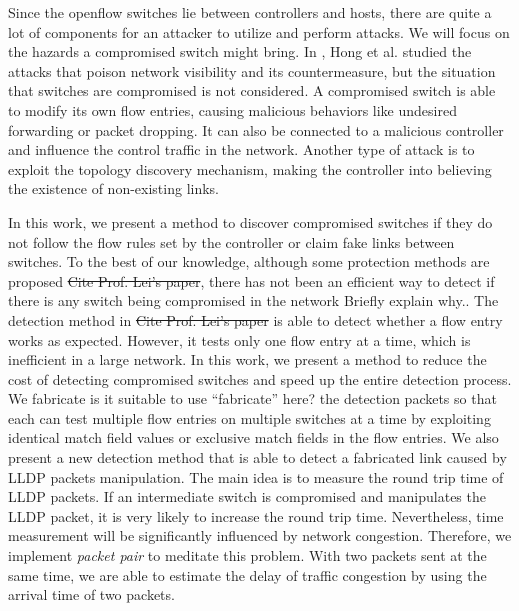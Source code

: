 Since the openflow switches lie between controllers and hosts, there are quite a lot of components for an attacker to utilize and perform attacks. We will focus on the hazards a compromised switch might bring.
In \cite{HXWG15}, Hong et al. studied the attacks that poison network visibility and its countermeasure, but the situation that switches are compromised is not considered. A compromised switch is able to modify its own flow entries, causing malicious behaviors like undesired forwarding or packet dropping. It can also be connected to a malicious controller and influence the control traffic in the network. Another type of attack is to exploit the topology discovery mechanism, making the controller into believing the existence of non-existing links.

In this work, we present a method to discover compromised switches if they do not follow the flow rules set by the controller or claim fake links between switches. To the best of our knowledge, although some protection methods are proposed \cite{CKGL15} \sout{{\color{red} Cite Prof. Lei's paper}}, there has not been an efficient way to detect if there is any switch being compromised in the network {\color{red} Briefly explain why.}. The detection method in \cite{CKGL15}\sout{{\color{red} Cite Prof. Lei's paper}} is able to detect whether a flow entry works as expected. However, it tests only one flow entry at a time, which is inefficient in a large network. In this work, we present a method to reduce the cost of detecting compromised switches and speed up the entire detection process. We fabricate{\color{blue} is it suitable to use ``fabricate'' here?} the detection packets so that each can test multiple flow entries on multiple switches at a time by exploiting identical match field values or exclusive match fields in the flow entries. We also present a new detection method that is able to detect a fabricated link caused by LLDP packets manipulation. The main idea is to measure the round trip time of LLDP packets. If an intermediate switch is compromised and manipulates the LLDP packet, it is very likely to increase the round trip time. Nevertheless, time measurement will be significantly influenced by network congestion. Therefore, we implement \textit{packet pair} to meditate this problem. With two packets sent at the same time, we are able to estimate the delay of traffic congestion by using the arrival time of two packets.

